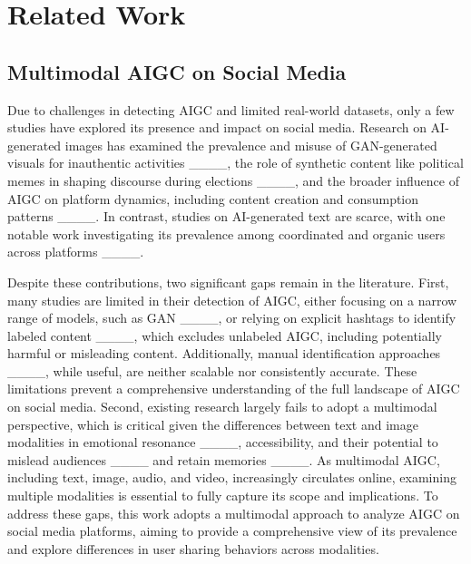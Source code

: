 \section{Related Work}
\subsection{Multimodal AIGC on Social Media}
Due to challenges in detecting AIGC and limited real-world datasets, only a few studies have explored its presence and impact on social media. Research on AI-generated images has examined the prevalence and misuse of GAN-generated visuals for inauthentic activities ____, the role of synthetic content like political memes in shaping discourse during elections ____, and the broader influence of AIGC on platform dynamics, including content creation and consumption patterns ____. In contrast, studies on AI-generated text are scarce, with one notable work investigating its prevalence among coordinated and organic users across platforms ____.

Despite these contributions, two significant gaps remain in the literature. First, many studies are limited in their detection of AIGC, either focusing on a narrow range of models, such as GAN ____, or relying on explicit hashtags to identify labeled content ____, which excludes unlabeled AIGC, including potentially harmful or misleading content. Additionally, manual identification approaches ____, while useful, are neither scalable nor consistently accurate. These limitations prevent a comprehensive understanding of the full landscape of AIGC on social media. Second, existing research largely fails to adopt a multimodal perspective, which is critical given the differences between text and image modalities in emotional resonance ____, accessibility, and their potential to mislead audiences ____ and retain memories ____. As multimodal AIGC, including text, image, audio, and video, increasingly circulates online, examining multiple modalities is essential to fully capture its scope and implications. To address these gaps, this work adopts a multimodal approach to analyze AIGC on social media platforms, aiming to provide a comprehensive view of its prevalence and explore differences in user sharing behaviors across modalities.

